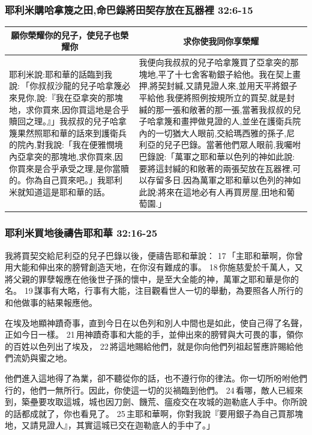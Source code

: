 \subsubsection{耶利米購哈拿篾之田,命巴錄將田契存放在瓦器裡 32:6-15}
\begin{table}[H]
\centering
\begin{tabular}{p{6.75cm}|p{10.5cm}}\hline\hline
\multicolumn{1}{c|}{願你榮耀你的兒子，使兒子也榮耀你}&\multicolumn{1}{c}{求你使我同你享榮耀}\\\hline
耶利米說:耶和華的話臨到我說: 「你叔叔沙龍的兒子哈拿篾必來見你,說:『我在亞拿突的那塊地，求你買來,因你買這地是合乎贖回之理。』」我叔叔的兒子哈拿篾果然照耶和華的話來到護衛兵的院內,對我說:「我在便雅憫境內亞拿突的那塊地,求你買來,因你買來是合乎承受之理,是你當贖的。你為自己買來吧。」我耶利米就知道這是耶和華的話。 
&我便向我叔叔的兒子哈拿篾買了亞拿突的那塊地,平了十七舍客勒銀子給他。我在契上畫押,將契封緘,又請見證人來,並用天平將銀子平給他.我便將照例按規所立的買契,就是封緘的那一張和敞著的那一張,當著我叔叔的兒子哈拿篾和畫押做見證的人,並坐在護衛兵院內的一切猶大人眼前,交給瑪西雅的孫子,尼利亞的兒子巴錄。當著他們眾人眼前,我囑咐巴錄說:「萬軍之耶和華以色列的神如此說:要將這封緘的和敞著的兩張契放在瓦器裡,可以存留多日.因為萬軍之耶和華以色列的神如此說:將來在這地必有人再買房屋,田地和葡萄園.」\\\hline
\end{tabular}
\end{table}



\subsubsection{耶利米買地後禱告耶和華 32:16-25}
我將買契交給尼利亞的兒子巴錄以後，便禱告耶和華說： 17 「主耶和華啊，你曾用大能和伸出來的膀臂創造天地，在你沒有難成的事。 18 你施慈愛於千萬人，又將父親的罪孽報應在他後世子孫的懷中，是至大全能的神，萬軍之耶和華是你的名。 19 謀事有大略，行事有大能，注目觀看世人一切的舉動，為要照各人所行的和他做事的結果報應他。 

在埃及地顯神蹟奇事，直到今日在以色列和別人中間也是如此，使自己得了名聲，正如今日一樣。 21 用神蹟奇事和大能的手，並伸出來的膀臂與大可畏的事，領你的百姓以色列出了埃及， 22 將這地賜給他們，就是你向他們列祖起誓應許賜給他們流奶與蜜之地。

他們進入這地得了為業，卻不聽從你的話，也不遵行你的律法。你一切所吩咐他們行的，他們一無所行。因此，你使這一切的災禍臨到他們。 24 看哪，敵人已經來到，築壘要攻取這城，城也因刀劍、饑荒、瘟疫交在攻城的迦勒底人手中。你所說的話都成就了，你也看見了。 25 主耶和華啊，你對我說『要用銀子為自己買那塊地，又請見證人』，其實這城已交在迦勒底人的手中了。」

